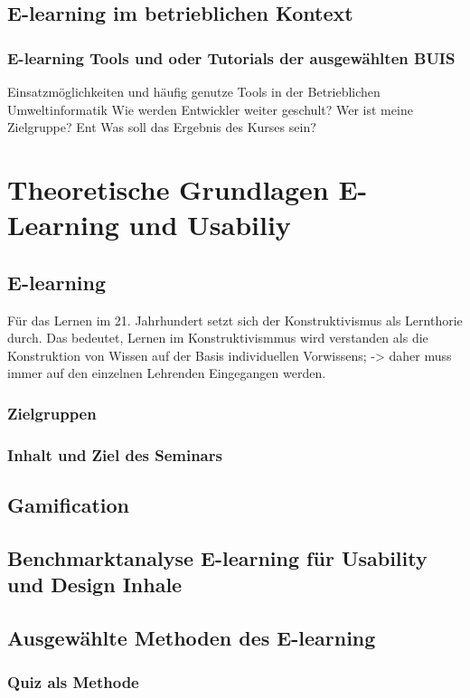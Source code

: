 \documentclass[a4paper, 12pt, twoside, BCOR=20mm, DIV=calc, abstracton, parskip=half*, toc=bibliography, toc=listof, headsepline, headings=small, numbers=enddot]{scrreprt} %
\begin{document}
\section{E-learning im betrieblichen Kontext}
\subsection{E-learning Tools und oder Tutorials der ausgewählten BUIS}
Einsatzmöglichkeiten und häufig genutze Tools in der Betrieblichen Umweltinformatik 
Wie werden Entwickler weiter geschult?
Wer ist meine Zielgruppe?  Ent
Was soll das Ergebnis des Kurses sein?

\chapter{Theoretische Grundlagen E-Learning und Usabiliy}
\section{E-learning}
Für das Lernen im 21. Jahrhundert setzt sich der Konstruktivismus als Lernthorie durch. Das bedeutet, Lernen im Konstruktivismmus wird verstanden als die Konstruktion von Wissen auf der Basis individuellen Vorwissens; -> daher muss immer auf den einzelnen Lehrenden Eingegangen werden. \cite[S.8]{1}
\subsection{Zielgruppen}
\subsection{Inhalt und Ziel des Seminars}

\section{Gamification}
\section{Benchmarktanalyse E-learning für Usability und Design Inhale}

\section{Ausgewählte Methoden des E-learning}
\subsection{Quiz als Methode}
\end{document}
